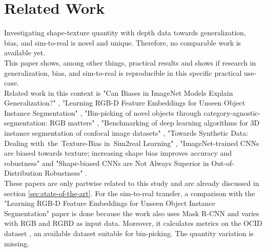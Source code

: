 	\section{Related Work}
	\label{sec:related-work}
		Investigating shape-texture quantity with depth data towards generalization, bias, and sim-to-real is novel and unique. Therefore, no comparable work is available yet. \\
		This paper shows, among other things, practical results and shows if research in generalization, bias, and sim-to-real is reproducible in this specific practical use-case.\\
		Related work in this context is "Can Biases in ImageNet Models Explain Generalization?" \cite{Gavrikov2024}, "Learning RGB-D Feature Embeddings for Unseen Object Instance Segmentation" \cite{Xiang2021}, "Bin-picking of novel objects through category-agnostic-segmentation: RGB matters" \cite{Raj2023}, "Benchmarking of deep learning algorithms for 3D instance segmentation of confocal image datasets" \cite{Kar2022}, "Towards Synthetic Data: Dealing with the Texture-Bias in Sim2real Learning" \cite{Tabak2023}, "ImageNet-trained CNNs are biased towards texture; increasing shape bias improves accuracy and robustness" \cite{Geirhos2022} and "Shape-biased CNNs are Not Always Superior in Out-of-Distribution Robustness" \cite{Qiu2024}.\\
		These papers are only partwise related to this study and are already discussed in section \ref{sec:state-of-the-art}.
		For the sim-to-real transfer, a comparison with the "Learning RGB-D Feature Embeddings for Unseen Object Instance Segmentation" \cite{Xiang2021} paper is done because the work also uses Mask R-CNN \cite{Kaiming2017} and varies with RGB and RGBD as input data. Moreover, it calculates metrics on the OCID dataset \cite{Suchi2019}, an available dataset suitable for bin-picking. The quantity variation is missing.
	
	
